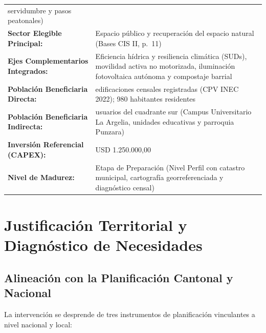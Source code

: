 \documentclass[
  spanish,
  letterpaper,
  DIV=11,
  numbers=noendperiod]{scrartcl}
\begin{document}
\begin{longtable}[]{@{}
  >{\raggedright\arraybackslash}p{}
  >{\raggedright\arraybackslash}p{}@{}}
servidumbre y pasos peatonales) \\
\textbf{Sector Elegible Principal:} & Espacio público y recuperación del
espacio natural (Bases CIS II, p.~11) \\
\textbf{Ejes Complementarios Integrados:} & Eficiencia hídrica y
resiliencia climática (SUDs), movilidad activa no motorizada,
iluminación fotovoltaica autónoma y compostaje barrial \\
\textbf{Población Beneficiaria Directa:} & 245 edificaciones censales
registradas (CPV INEC 2022); 980 habitantes residentes \\
\textbf{Población Beneficiaria Indirecta:} & 15.000 usuarios del
cuadrante sur (Campus Universitario La Argelia, unidades educativas y
parroquia Punzara) \\
\textbf{Inversión Referencial (CAPEX):} & USD 1.250.000,00 \\
\textbf{Nivel de Madurez:} & Etapa de Preparación (Nivel Perfil con
catastro municipal, cartografía georreferenciada y diagnóstico
censal) \\
\end{longtable}

\section{Justificación Territorial y Diagnóstico de
Necesidades}\label{justificaciuxf3n-territorial-y-diagnuxf3stico-de-necesidades}

\subsection{Alineación con la Planificación Cantonal y
Nacional}\label{alineaciuxf3n-con-la-planificaciuxf3n-cantonal-y-nacional}

La intervención se desprende de tres instrumentos de planificación
vinculantes a nivel nacional y local:
\end{document}
